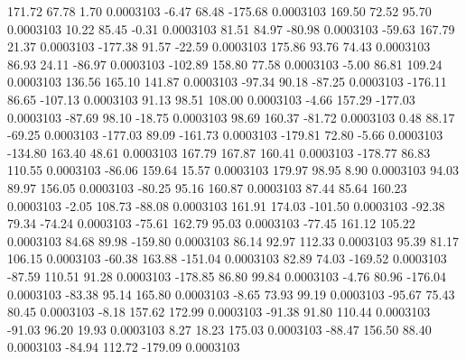       171.72       67.78        1.70     0.0003103
       -6.47       68.48     -175.68     0.0003103
      169.50       72.52       95.70     0.0003103
       10.22       85.45       -0.31     0.0003103
       81.51       84.97      -80.98     0.0003103
      -59.63      167.79       21.37     0.0003103
     -177.38       91.57      -22.59     0.0003103
      175.86       93.76       74.43     0.0003103
       86.93       24.11      -86.97     0.0003103
     -102.89      158.80       77.58     0.0003103
       -5.00       86.81      109.24     0.0003103
      136.56      165.10      141.87     0.0003103
      -97.34       90.18      -87.25     0.0003103
     -176.11       86.65     -107.13     0.0003103
       91.13       98.51      108.00     0.0003103
       -4.66      157.29     -177.03     0.0003103
      -87.69       98.10      -18.75     0.0003103
       98.69      160.37      -81.72     0.0003103
        0.48       88.17      -69.25     0.0003103
     -177.03       89.09     -161.73     0.0003103
     -179.81       72.80       -5.66     0.0003103
     -134.80      163.40       48.61     0.0003103
      167.79      167.87      160.41     0.0003103
     -178.77       86.83      110.55     0.0003103
      -86.06      159.64       15.57     0.0003103
      179.97       98.95        8.90     0.0003103
       94.03       89.97      156.05     0.0003103
      -80.25       95.16      160.87     0.0003103
       87.44       85.64      160.23     0.0003103
       -2.05      108.73      -88.08     0.0003103
      161.91      174.03     -101.50     0.0003103
      -92.38       79.34      -74.24     0.0003103
      -75.61      162.79       95.03     0.0003103
      -77.45      161.12      105.22     0.0003103
       84.68       89.98     -159.80     0.0003103
       86.14       92.97      112.33     0.0003103
       95.39       81.17      106.15     0.0003103
      -60.38      163.88     -151.04     0.0003103
       82.89       74.03     -169.52     0.0003103
      -87.59      110.51       91.28     0.0003103
     -178.85       86.80       99.84     0.0003103
       -4.76       80.96     -176.04     0.0003103
      -83.38       95.14      165.80     0.0003103
       -8.65       73.93       99.19     0.0003103
      -95.67       75.43       80.45     0.0003103
       -8.18      157.62      172.99     0.0003103
      -91.38       91.80      110.44     0.0003103
      -91.03       96.20       19.93     0.0003103
        8.27       18.23      175.03     0.0003103
      -88.47      156.50       88.40     0.0003103
      -84.94      112.72     -179.09     0.0003103
